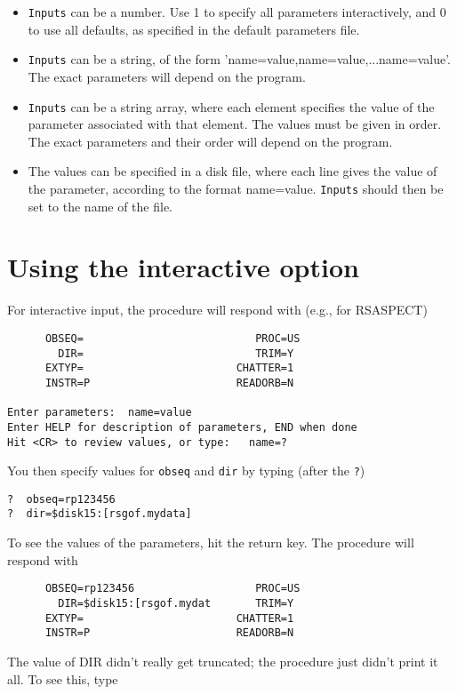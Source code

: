 \begin{itemize}
\item  {\tt Inputs} can be a number. Use 1 to specify all parameters interactively,
and 0 to use all defaults, as specified in the default parameters file.
 
\item  {\tt Inputs} can be a string, of the form 'name=value,name=value,...name=value'.
The exact parameters will depend on the program.
 
\item  {\tt Inputs} can be a string array, where each element specifies the value of
the parameter associated with that element. The values must be given in
order. The exact parameters and their order will depend on the program.
 
\item  The values can be specified in a disk file, where each line gives the
value of the parameter, according to the format name=value. {\tt Inputs}
should then be set to the name of the file.
\end{itemize}
 

\section{Using the interactive option}
 
For interactive input, the procedure will respond with (e.g., for RSASPECT)

\medskip\noindent
\begin{verbatim}
      OBSEQ=                           PROC=US
        DIR=                           TRIM=Y
      EXTYP=                        CHATTER=1
      INSTR=P                       READORB=N
 
Enter parameters:  name=value
Enter HELP for description of parameters, END when done
Hit <CR> to review values, or type:   name=?
\end{verbatim}
You then specify values for {\tt obseq} and {\tt dir} by typing (after the {\tt ?})

\medskip\noindent
\begin{verbatim}
?  obseq=rp123456
?  dir=$disk15:[rsgof.mydata]
\end{verbatim}
To see the values of the parameters, hit the return key. The procedure will
respond with

\medskip\noindent
\begin{verbatim}
      OBSEQ=rp123456                   PROC=US
        DIR=$disk15:[rsgof.mydat       TRIM=Y
      EXTYP=                        CHATTER=1
      INSTR=P                       READORB=N
\end{verbatim}
The value of DIR didn't really get truncated; the procedure just didn't
print it all. To see this, type

